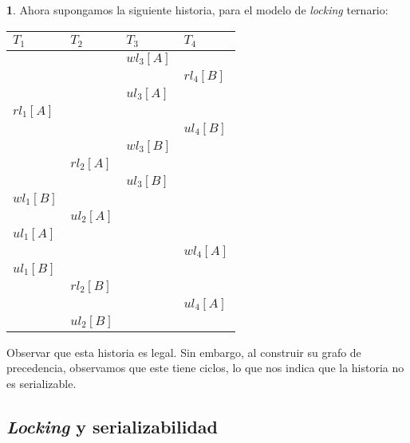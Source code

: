 \documentclass[english,titlepage]{article}
\theoremstyle{definition}
\theoremstyle{definition}
\newtheorem{example}[thm]{\protect\examplename}
\providecommand{\examplename}{Ejemplo}
\begin{document}
\begin{example}
Ahora supongamos la siguiente historia, para el modelo de \emph{locking}
ternario:

\vspace{10pt}

\begin{tabular}{ l l l l }
  $T_1$         & $T_2$     & $T_3$     & $T_4$     \\
  \hline
                &           & $wl_3[A]$ &           \\
                &           &           & $rl_4[B]$ \\
                &           & $ul_3[A]$ &           \\
  $rl_1[A]$     &           &           &           \\
                &           &           & $ul_4[B]$ \\
                &           & $wl_3[B]$ &           \\
                & $rl_2[A]$ &           &           \\
                &           & $ul_3[B]$ &           \\
  $wl_1[B]$     &           &           &           \\
                & $ul_2[A]$ &           &           \\
  $ul_1[A]$     &           &           &           \\
                &           &           & $wl_4[A]$ \\
  $ul_1[B]$     &           &           &           \\
                & $rl_2[B]$ &           &           \\
                &           &           & $ul_4[A]$ \\
                & $ul_2[B]$ &           &           \\
  \hline
\end{tabular}

\vspace{10pt}

Observar que esta historia es legal. Sin embargo, al construir su grafo de
precedencia, observamos que este tiene ciclos, lo que nos indica que la
historia no es serializable.
\end{example}

\subsection{\emph{Locking} y serializabilidad}
\end{document}
